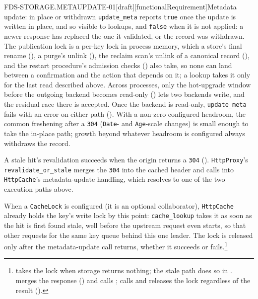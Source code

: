 \begin{requirement}{FDS-STORAGE.METAUPDATE-01}[draft][functionalRequirement]{Metadata update: in place or withdrawn}
  \texttt{update\_meta} reports \texttt{true} once the update is written in
  place, and so visible to lookups, and \texttt{false} when it is not
  applied: a newer response has replaced the one it validated, or the
  record was withdrawn.
  The publication lock is a per-key lock
  in process memory, which a store's final rename
  (), a purge's unlink
  (), the reclaim scan's unlink of a canonical
  record (), and the restart procedure's
  admission checks () also take, so none can
  land between a confirmation and the action that depends on it; a lookup
  takes it only for the last read described above. Across processes, only
  the hot-upgrade window before the outgoing backend becomes read-only
  () lets two backends write, and the residual
  race there is accepted. Once the backend is read-only, \texttt{update\_meta}
  fails with an error on either path ().
  With a non-zero configured headroom,
  the common freshening after a \texttt{304} (\texttt{Date}- and
  \texttt{Age}-scale changes) is small enough to take the in-place path;
  growth beyond whatever headroom is configured always withdraws the
  record.

  A stale hit's revalidation succeeds when the origin returns a
  \texttt{304} ().
  \texttt{HttpProxy}'s \texttt{revalidate\_or\_stale} merges the
  \texttt{304} into the cached header and calls into \texttt{HttpCache}'s
  metadata-update handling, which resolves to one of the two execution
  paths above.

  When a \texttt{CacheLock} is configured (it is an optional collaborator),
  \texttt{HttpCache} already holds the key's write lock by this point:
  \texttt{cache\_lookup} takes it as soon as the hit is first found stale,
  well before the upstream request even starts, so that other requests
  for the same key queue behind this one leader. The lock is released
  only after the metadata-update call returns, whether it succeeds or
  fails.\footnote{
  takes the lock when storage returns nothing; the stale path does so in
  .
  merges the response
  ()
  and calls
  ;
  calls  and
  releases the lock regardless of the result
  ().}


\end{requirement}
